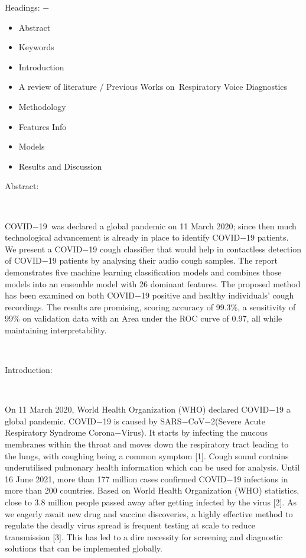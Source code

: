 \documentclass[11pt]{article}
\begin{document}
Headings: $-$

\begin{itemize}
	\item Abstract

	\item Keywords

	\item Introduction

	\item A review of literature / Previous Works on Respiratory Voice Diagnostics

	\item Methodology

	\item Features Info

	\item Models

	\item Results and Discussion

\vspace{37\baselineskip}
\end{itemize}
{\LARGE \textcolor[HTML]{0E101A}{Abstract: }}

\textcolor[HTML]{0E101A}{ }

\textcolor[HTML]{0E101A}{COVID$-$19} was declared a global pandemic on 11 March 2020; since then much technological advancement is already in place to identify COVID$-$19 patients. We present a COVID$-$19 cough classifier that would help in contactless detection of COVID$-$19 patients by analysing their audio cough samples. The report demonstrates five machine learning classification models and combines those models into an ensemble model with 26 dominant features. The proposed method has been examined on both COVID$-$19 positive and healthy individuals' cough recordings. The results are promising, scoring accuracy of 99.3$\%$, a sensitivity of 99$\%$ on validation data with an Area under the ROC curve of 0.97, all while maintaining interpretability.\textcolor[HTML]{0E101A}{}

\textcolor[HTML]{0E101A}{ }

\vspace{1\baselineskip}
{\LARGE \textcolor[HTML]{0E101A}{Introduction:}}

\textcolor[HTML]{0E101A}{ }

\textcolor[HTML]{0E101A}{On 11 March 2020, World Health Organization (WHO) declared COVID$-$19 a global pandemic. COVID$-$19 is caused by SARS$-$CoV$-$2(Severe Acute Respiratory Syndrome Corona$-$Virus). It starts by infecting the mucous membranes within the throat and moves down the respiratory tract leading to the lungs, with coughing being a common symptom [1]. Cough sound contains underutilised pulmonary health information which can be used for analysis. Until 16 June 2021, more than 177 million cases confirmed COVID$-$19 infections in more than 200 countries. Based on World Health Organization (WHO) statistics, close to 3.8 million people passed away after getting infected by the virus [2]. As we eagerly await new drug and vaccine discoveries, a highly effective method to regulate the deadly virus spread is frequent testing at scale to reduce transmission [3]. This has led to a dire necessity for screening and diagnostic solutions that can be implemented globally.}
\end{document}
